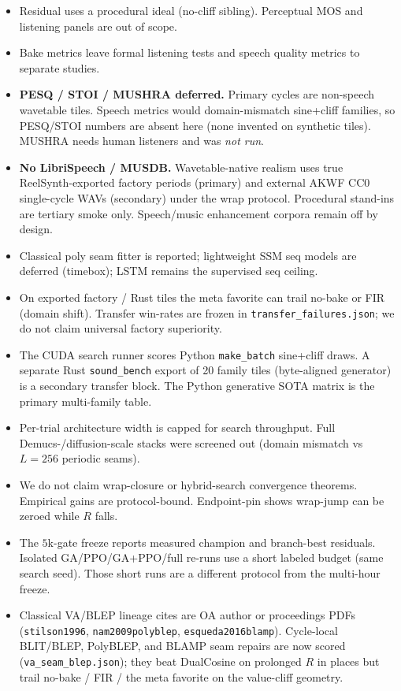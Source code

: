 \begin{itemize}
  \item Residual uses a procedural ideal (no-cliff sibling). Perceptual MOS and listening panels are out of scope.
  \item Bake metrics leave formal listening tests and speech quality metrics to separate studies.
  \item \textbf{PESQ / STOI / MUSHRA deferred.} Primary cycles are non-speech wavetable tiles. Speech metrics would domain-mismatch sine{+}cliff families, so PESQ/STOI numbers are absent here (none invented on synthetic tiles). MUSHRA needs human listeners and was \emph{not run}.
  \item \textbf{No LibriSpeech / MUSDB.} Wavetable-native realism uses true ReelSynth-exported factory periods (primary) and external AKWF CC0 single-cycle WAVs (secondary) under the wrap protocol. Procedural stand-ins are tertiary smoke only. Speech/music enhancement corpora remain off by design.
  \item Classical poly seam fitter is reported; lightweight SSM seq models are deferred (timebox); LSTM remains the supervised seq ceiling.
  \item On exported factory / Rust tiles the meta favorite can trail no-bake or FIR (domain shift). Transfer win-rates are frozen in \texttt{transfer\_failures.json}; we do not claim universal factory superiority.
  \item The CUDA search runner scores Python \texttt{make\_batch} sine{+}cliff draws. A separate Rust \texttt{sound\_bench} export of 20 family tiles (byte-aligned generator) is a secondary transfer block. The Python generative SOTA matrix is the primary multi-family table.
  \item Per-trial architecture width is capped for search throughput. Full Demucs-/diffusion-scale stacks were screened out (domain mismatch vs $L{=}256$ periodic seams).
  \item We do not claim wrap-closure or hybrid-search convergence theorems. Empirical gains are protocol-bound. Endpoint-pin shows wrap-jump can be zeroed while $R$ falls.
  \item The $5$k-gate freeze reports measured champion and branch-best residuals. Isolated GA/PPO/GA{+}PPO/full re-runs use a short labeled budget (same search seed). Those short runs are a different protocol from the multi-hour freeze.
  \item Classical VA/BLEP lineage cites are OA author or proceedings PDFs (\texttt{stilson1996}, \texttt{nam2009polyblep}, \texttt{esqueda2016blamp}). Cycle-local BLIT/BLEP, PolyBLEP, and BLAMP seam repairs are now scored (\texttt{va\_seam\_blep.json}); they beat DualCosine on prolonged $R$ in places but trail no-bake / FIR / the meta favorite on the value-cliff geometry.
\end{itemize}

